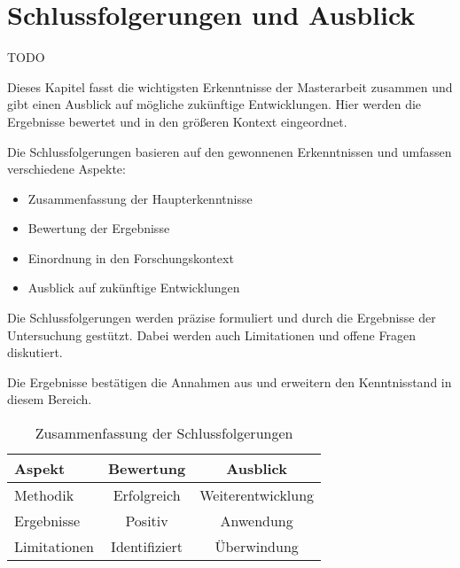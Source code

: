 
\chapter{Schlussfolgerungen und Ausblick}\label{cha:conclusion}

TODO 


Dieses Kapitel fasst die wichtigsten Erkenntnisse der Masterarbeit zusammen und gibt einen Ausblick auf mögliche zukünftige Entwicklungen. Hier werden die Ergebnisse bewertet und in den größeren Kontext eingeordnet.

Die Schlussfolgerungen basieren auf den gewonnenen Erkenntnissen und umfassen verschiedene Aspekte:

\begin{itemize}[leftmargin=0.63cm, label=\textbullet]
    \item Zusammenfassung der Haupterkenntnisse
    \item Bewertung der Ergebnisse
    \item Einordnung in den Forschungskontext
    \item Ausblick auf zukünftige Entwicklungen
\end{itemize}

Die Schlussfolgerungen werden präzise formuliert und durch die Ergebnisse der Untersuchung gestützt. Dabei werden auch Limitationen und offene Fragen diskutiert.

Die Ergebnisse bestätigen die Annahmen aus \cite{mustermann2023} und erweitern den Kenntnisstand in diesem Bereich.

\begin{table}[htbp]
\centering
\caption{Zusammenfassung der Schlussfolgerungen}
\label{tab:schlussfolgerungen}
\begin{tabular}{lcc}
\toprule
Aspekt & Bewertung & Ausblick \\
\midrule
Methodik & Erfolgreich & Weiterentwicklung \\
Ergebnisse & Positiv & Anwendung \\
Limitationen & Identifiziert & Überwindung \\
\bottomrule
\end{tabular}
\end{table}

